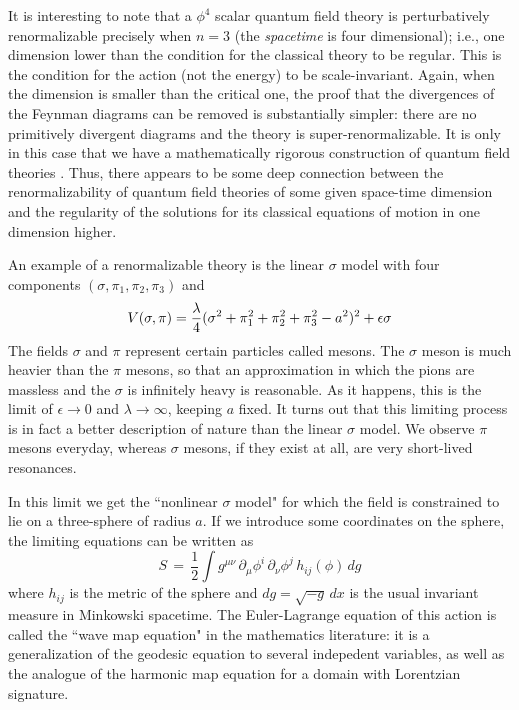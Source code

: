 \documentclass{amsart}
\begin{document}
It is interesting to note that a $\phi^4$  scalar quantum field theory is perturbatively renormalizable precisely when $n=3$ (the {\it spacetime} is four dimensional); i.e.,  one dimension lower than the condition for the classical theory to be regular. This is the condition for the action (not the energy) to be scale-invariant. Again, when the dimension is smaller than the critical one, the proof that the divergences of the Feynman diagrams can be removed is substantially simpler: there are no primitively divergent diagrams and the theory is super-renormalizable. It is only in this case that we have a mathematically rigorous construction of quantum field theories \cite{GlimmJaffe}. Thus, there appears to be some deep connection between the renormalizability of quantum field theories of some given space-time dimension and the regularity of the solutions for its classical equations of motion in one dimension higher.

An example of a renormalizable theory is the linear $\sigma$ model \cite{BenjaminLee} with four components $(\sigma,\pi_1,\pi_2,\pi_3)$ and
\begin{equation}
V(\sigma,\pi)={\lambda \over 4}(\sigma^2+\pi_1^2+\pi_2^2+\pi_3^2-a^2)^2+\epsilon\sigma
\end{equation}
The fields $\sigma$ and $\pi$ represent certain particles called mesons. The $\sigma$ meson is much heavier than the $\pi$ mesons, so that an approximation in which the pions are massless and the $\sigma$ is infinitely heavy is reasonable. As it happens, this is the limit of $\epsilon\to 0$ and $\lambda\to \infty$, keeping $a$ fixed. It turns out that this limiting process is in fact a better description of nature than the linear $\sigma$ model. We observe $\pi$ mesons everyday, whereas $\sigma$ mesons, if they exist at all, are very short-lived resonances.

In this limit we get the ``nonlinear $\sigma$ model" for which the field is constrained to lie on a three-sphere of radius $a$. If we introduce some coordinates on the sphere, the limiting equations can be written as
\begin{equation}
S\,=\,\frac 12 \int  g^{\mu\nu} \,\partial_\mu\phi^i\, \partial_\nu\phi^j\,
h_{ij}(\phi)\,dg
\end{equation}
where $h_{ij}$ is the metric of the sphere and $dg=\sqrt{-g}\, dx$ is the usual invariant measure in Minkowski spacetime. The Euler-Lagrange equation of this action is called the ``wave map equation" in the mathematics literature: it is a generalization of the geodesic equation to several indepedent variables, as well as the analogue of the harmonic map equation for a domain with Lorentzian signature.
\end{document}
